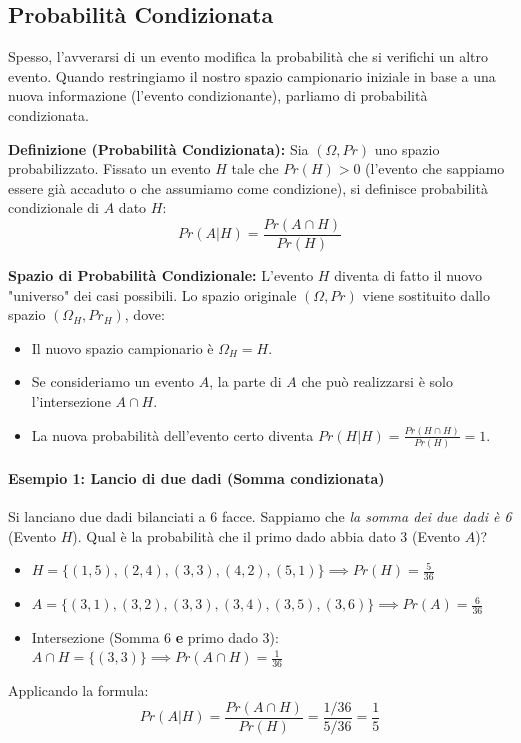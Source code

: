 \documentclass[12pt, a4paper]{article}
\begin{document}
\subsection{Probabilità Condizionata}
Spesso, l'avverarsi di un evento modifica la probabilità che si verifichi un altro evento. Quando restringiamo il nostro spazio campionario iniziale in base a una nuova informazione (l'evento condizionante), parliamo di probabilità condizionata.

\textbf{Definizione (Probabilità Condizionata):} Sia $(\Omega, Pr)$ uno spazio probabilizzato. Fissato un evento $H$ tale che $Pr(H) > 0$ (l'evento che sappiamo essere già accaduto o che assumiamo come condizione), si definisce probabilità condizionale di $A$ dato $H$:
$$ Pr(A | H) = \frac{Pr(A \cap H)}{Pr(H)} $$

\textbf{Spazio di Probabilità Condizionale:}
L'evento $H$ diventa di fatto il nuovo "universo" dei casi possibili. Lo spazio originale $(\Omega, Pr)$ viene sostituito dallo spazio $(\Omega_H, Pr_H)$, dove:
\begin{itemize}
    \item Il nuovo spazio campionario è $\Omega_H = H$.
    \item Se consideriamo un evento $A$, la parte di $A$ che può realizzarsi è solo l'intersezione $A \cap H$.
    \item La nuova probabilità dell'evento certo diventa $Pr(H|H) = \frac{Pr(H \cap H)}{Pr(H)} = 1$.
\end{itemize}

\paragraph{Esempio 1: Lancio di due dadi (Somma condizionata)}
Si lanciano due dadi bilanciati a 6 facce. Sappiamo che \textit{la somma dei due dadi è 6} (Evento $H$). Qual è la probabilità che il primo dado abbia dato 3 (Evento $A$)?
\begin{itemize}
    \item $H = \{(1,5), (2,4), (3,3), (4,2), (5,1)\} \implies Pr(H) = \frac{5}{36}$
    \item $A = \{(3,1), (3,2), (3,3), (3,4), (3,5), (3,6)\} \implies Pr(A) = \frac{6}{36}$
    \item Intersezione (Somma 6 \textbf{e} primo dado 3): $A \cap H = \{(3,3)\} \implies Pr(A \cap H) = \frac{1}{36}$
\end{itemize}
Applicando la formula:
$$ Pr(A | H) = \frac{Pr(A \cap H)}{Pr(H)} = \frac{1/36}{5/36} = \frac{1}{5} $$
\end{document}
